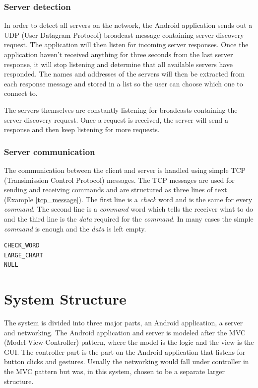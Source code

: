 \documentclass[12pt,a4paper,notitlepage]{report}
\begin{document}
\subsubsection{Server detection}
In order to detect all servers on the network, the Android application sends out a UDP (User Datagram Protocol) broadcast message containing server discovery request. The application will then listen for incoming server responses. Once the application haven't received anything for three seconds from the last server response, it will stop listening and determine that all available servers have responded. The names and addresses of the servers will then be extracted from each response message and stored in a list so the user can choose which one to connect to.

The servers themselves are constantly listening for broadcasts containing the server discovery request. Once a request is received, the server will send a response and then keep listening for more requests.

\subsubsection{Server communication}
The communication between the client and server is handled using simple TCP (Transimission Control Protocol) messages. The TCP messages are used for sending and receiving commands and are structured as three lines of text (Example \ref{tcp_message}). The first line is a \textit{check} word and is the same for every \textit{command}. The second line is a \textit{command} word which tells the receiver what to do and the third line is the \textit{data} required for the \textit{command}. In many cases the simple \textit{command} is enough and the \textit{data} is left empty.

\begin{center}
\renewcommand{\lstlistingname}{Example}
  \lstset{%
    title=Example of TCP message,
    basicstyle=\ttfamily\footnotesize\bfseries,
    xleftmargin=.2\textwidth, xrightmargin=.2\textwidth
  }
\begin{lstlisting}[caption=TCP Message, label=tcp_message]
CHECK_WORD
LARGE_CHART
NULL
\end{lstlisting}
\end{center}


\section{System Structure}
The system is divided into three major parts, an Android application, a server and networking. The Android application and server is modeled after the MVC (Model-View-Controller) pattern, where the model is the logic and the view is the GUI. The controller part is the part on the Android application that listens for button clicks and gestures. Usually the networking would fall under controller in the MVC pattern but was, in this system, chosen to be a separate larger structure.
\end{document}
